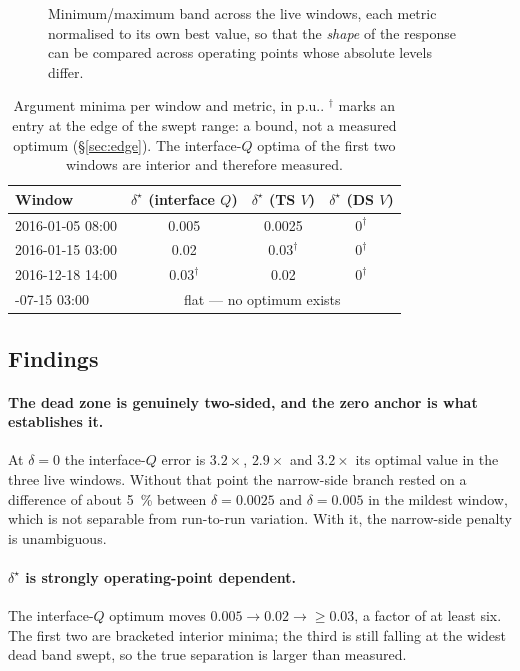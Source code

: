 \documentclass[11pt,a4paper]{article}
\newcommand{\pu}{\ensuremath{\mathrm{p.u.}}}
\newcommand{\dz}{\ensuremath{\delta}}
\begin{document}
\begin{figure}[htbp]
\centering
\caption{Minimum/maximum band across the live windows, each metric normalised
to its own best value, so that the \emph{shape} of the response can be compared
across operating points whose absolute levels differ.}
\label{fig:band}
\end{figure}

\begin{table}[htbp]
\centering
\begin{tabular}{lccc}
\toprule
Window & $\dz^\star$ (interface $Q$) & $\dz^\star$ (TS $V$) & $\dz^\star$ (DS $V$) \\
\midrule
2016-01-05 08:00 & 0.005 & 0.0025 & $0^{\dagger}$ \\
2016-01-15 03:00 & 0.02  & $0.03^{\dagger}$ & $0^{\dagger}$ \\
2016-12-18 14:00 & $0.03^{\dagger}$ & 0.02 & $0^{\dagger}$ \\
\addlinespace
2016-07-15 03:00 & \multicolumn{3}{c}{flat --- no optimum exists} \\
\bottomrule
\end{tabular}
\caption{Argument minima per window and metric, in \pu. $^{\dagger}$ marks an
entry at the edge of the swept range: a bound, not a measured optimum
(\S\ref{sec:edge}). The interface-$Q$ optima of the first two windows are
interior and therefore measured.}
\label{tab:optima}
\end{table}

\subsection{Findings}
\label{sec:findings}

\paragraph{The dead zone is genuinely two-sided, and the zero anchor is what
establishes it.} At $\dz=0$ the interface-$Q$ error is
$3.2\times$, $2.9\times$ and $3.2\times$ its optimal value in the three live
windows. Without that point the narrow-side branch rested on a difference of
about \SI{5}{\percent} between $\dz=0.0025$ and $\dz=0.005$ in the mildest
window, which is not separable from run-to-run variation. With it, the
narrow-side penalty is unambiguous.

\paragraph{$\dz^\star$ is strongly operating-point dependent.} The
interface-$Q$ optimum moves $0.005 \rightarrow 0.02 \rightarrow \geq 0.03$, a
factor of at least six. The first two are bracketed interior minima; the third
is still falling at the widest dead band swept, so the true separation is
larger than measured.
\end{document}
